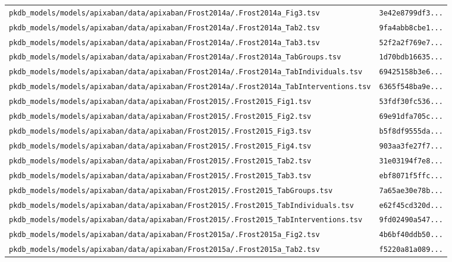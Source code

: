 \begin{longtable}{ll}
\texttt{pkdb\_models/models/apixaban/data/apixaban/Frost2014a/.Frost2014a\_Fig3.tsv} & \texttt{3e42e8799df3...} \\
\texttt{pkdb\_models/models/apixaban/data/apixaban/Frost2014a/.Frost2014a\_Tab2.tsv} & \texttt{9fa4abb8cbe1...} \\
\texttt{pkdb\_models/models/apixaban/data/apixaban/Frost2014a/.Frost2014a\_Tab3.tsv} & \texttt{52f2a2f769e7...} \\
\texttt{pkdb\_models/models/apixaban/data/apixaban/Frost2014a/.Frost2014a\_TabGroups.tsv} & \texttt{1d70bdb16635...} \\
\texttt{pkdb\_models/models/apixaban/data/apixaban/Frost2014a/.Frost2014a\_TabIndividuals.tsv} & \texttt{69425158b3e6...} \\
\texttt{pkdb\_models/models/apixaban/data/apixaban/Frost2014a/.Frost2014a\_TabInterventions.tsv} & \texttt{6365f548ba9e...} \\
\texttt{pkdb\_models/models/apixaban/data/apixaban/Frost2015/.Frost2015\_Fig1.tsv} & \texttt{53fdf30fc536...} \\
\texttt{pkdb\_models/models/apixaban/data/apixaban/Frost2015/.Frost2015\_Fig2.tsv} & \texttt{69e91dfa705c...} \\
\texttt{pkdb\_models/models/apixaban/data/apixaban/Frost2015/.Frost2015\_Fig3.tsv} & \texttt{b5f8df9555da...} \\
\texttt{pkdb\_models/models/apixaban/data/apixaban/Frost2015/.Frost2015\_Fig4.tsv} & \texttt{903aa3fe27f7...} \\
\texttt{pkdb\_models/models/apixaban/data/apixaban/Frost2015/.Frost2015\_Tab2.tsv} & \texttt{31e03194f7e8...} \\
\texttt{pkdb\_models/models/apixaban/data/apixaban/Frost2015/.Frost2015\_Tab3.tsv} & \texttt{ebf8071f5ffc...} \\
\texttt{pkdb\_models/models/apixaban/data/apixaban/Frost2015/.Frost2015\_TabGroups.tsv} & \texttt{7a65ae30e78b...} \\
\texttt{pkdb\_models/models/apixaban/data/apixaban/Frost2015/.Frost2015\_TabIndividuals.tsv} & \texttt{e62f45cd320d...} \\
\texttt{pkdb\_models/models/apixaban/data/apixaban/Frost2015/.Frost2015\_TabInterventions.tsv} & \texttt{9fd02490a547...} \\
\texttt{pkdb\_models/models/apixaban/data/apixaban/Frost2015a/.Frost2015a\_Fig2.tsv} & \texttt{4b6bf40ddb50...} \\
\texttt{pkdb\_models/models/apixaban/data/apixaban/Frost2015a/.Frost2015a\_Tab2.tsv} & \texttt{f5220a81a089...} \\

\end{longtable}
